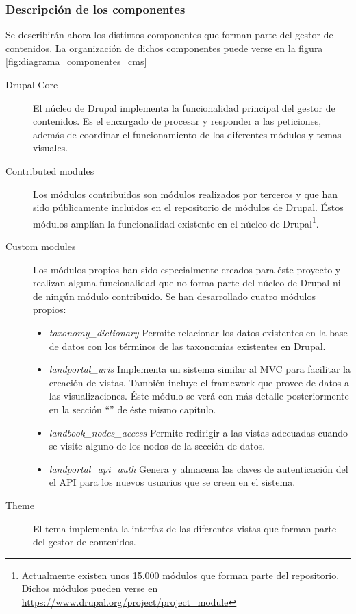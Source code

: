 \subsubsection{Descripción de los componentes}
Se describirán ahora los distintos componentes que forman parte del gestor de contenidos. La organización de dichos componentes puede verse en la figura \ref{fig:diagrama_componentes_cms}
\begin{description}
	\item[Drupal Core]  El núcleo de Drupal implementa la funcionalidad principal del gestor de contenidos.  Es el encargado de procesar y responder a las peticiones, además de coordinar el funcionamiento de los diferentes módulos y temas visuales.
	\item[Contributed modules]  Los módulos contribuidos son módulos realizados por terceros y que han sido públicamente incluidos en el repositorio de módulos de Drupal.  Éstos módulos amplían la funcionalidad existente en el núcleo de Drupal\footnote{Actualmente existen unos 15.000 módulos que forman parte del repositorio.  Dichos módulos pueden verse en \url{https://www.drupal.org/project/project_module}}.
	\item[Custom modules]  Los módulos propios han sido especialmente creados para éste proyecto y realizan alguna funcionalidad que no forma parte del núcleo de Drupal ni de ningún módulo contribuido.  Se han desarrollado cuatro módulos propios:
		\begin{itemize}
			\item \textit{taxonomy\_dictionary}  Permite relacionar los datos existentes en la base de datos con los términos de las taxonomías existentes en Drupal.
			\item \textit{landportal\_uris}  Implementa un sistema similar al MVC para facilitar la creación de vistas.  También incluye el framework que provee de datos a las visualizaciones.  Éste módulo se verá con más detalle posteriormente en la sección ``'' de éste mismo capítulo.
			\item \textit{landbook\_nodes\_access}  Permite redirigir a las vistas adecuadas cuando se visite alguno de los nodos de la sección de datos.
			\item \textit{landportal\_api\_auth}  Genera y almacena las claves de autenticación del el API para los nuevos usuarios que se creen en el sistema.
		\end{itemize}
	\item[Theme]  El tema implementa la interfaz de las diferentes vistas que forman parte del gestor de contenidos.
\end{description}


